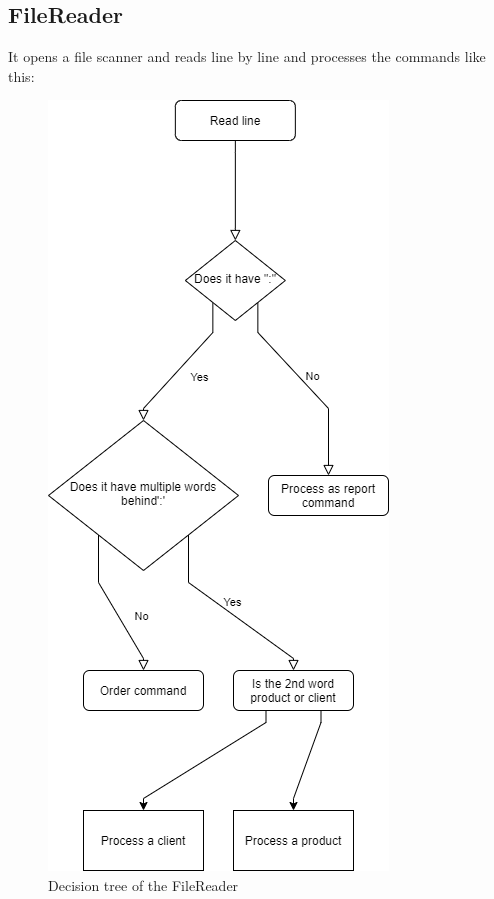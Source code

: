 \documentclass[10pt,a4paper]{article}
\begin{document}
\subsection{FileReader}
It opens a file scanner and reads line by line and processes the commands like this:
\begin{figure}[!htb]
\centering
\includegraphics[scale=0.60]{diagram.png}
\caption{Decision tree of the FileReader}
\end{figure}
\FloatBarrier
\end{document}
